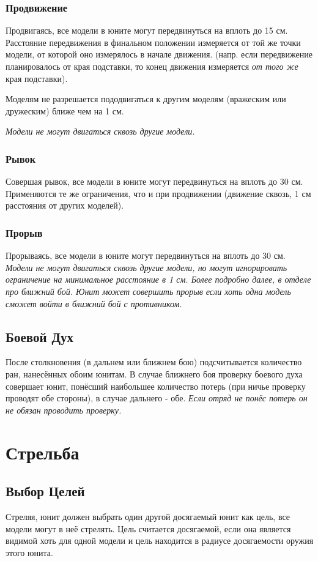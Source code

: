 \documentclass[twocolumn]{article}
\begin{document}
\subsubsection{Продвижение}
Продвигаясь, все модели в юните могут передвинуться на вплоть до 15 см. Расстояние передвижения в финальном положении измеряется от той же точки модели, от которой оно измерялось в начале движения. (напр. если передвижение планировалось от края подставки, то конец движения измеряется \emph{от того же} края подставки).

Моделям не разрешается пододвигаться к другим моделям (вражеским или дружеским) ближе чем на 1 см.

\emph{Модели не могут двигаться сквозь другие модели.}

\subsubsection{Рывок}
Совершая рывок, все модели в юните могут передвинуться на вплоть до 30 см. Применяются те же ограничения, что и при продвижении (движение сквозь, 1 см расстояния от других моделей).

\subsubsection{Прорыв}
Прорываясь, все модели в юните могут передвинуться на вплоть до 30 см. \emph{Модели не могут двигаться сквозь другие модели, но могут игнорировать ограничение на минимальное расстояние в 1 см. Более подробно далее, в отделе про ближний бой. Юнит может совершить прорыв если хоть одна модель сможет войти в ближний бой с противником.}

\subsection{Боевой Дух}
После столкновения (в дальнем или ближнем бою) подсчитывается количество ран, нанесённых обоим юнитам. В случае ближнего боя проверку боевого духа совершает юнит, понёсший наибольшее количество потерь (при ничье проверку проводят обе стороны), в случае дальнего - обе. \emph{Если отряд не понёс потерь он не обязан проводить проверку.}

\newpage

\section{Стрельба}
\subsection{Выбор Целей}
Стреляя, юнит должен выбрать один другой досягаемый юнит как цель, все модели могут в неё стрелять.
Цель считается досягаемой, если она является видимой хоть для одной модели и цель находится в радиусе досягаемости оружия этого юнита.
\end{document}
